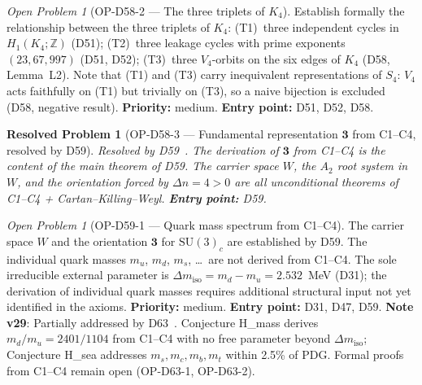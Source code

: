 \documentclass[11pt,a4paper]{article}
\newtheorem{resolvedproblem}{Resolved Problem}
\theoremstyle{plain}
\theoremstyle{definition}
\theoremstyle{remark}
\newtheorem{openproblem}[theorem]{Open Problem}
\begin{document}
\begin{openproblem}[OP-D58-2 --- The three triplets of $K_4$]
\label{op:D58two}
Establish formally the relationship between the three triplets of $K_4$: (T1)~three independent cycles in $H_1(K_4;\mathbb{Z})$ (D51); (T2)~three leakage cycles with prime exponents $(23,67,997)$ (D51, D52); (T3)~three $V_4$-orbits on the six edges of $K_4$ (D58, Lemma~L2). Note that (T1) and (T3) carry inequivalent representations of $S_4$: $V_4$ acts faithfully on (T1) but trivially on (T3), so a naive bijection is excluded (D58, negative result). \textbf{Priority:} medium. \textbf{Entry point:} D51, D52, D58.
\end{openproblem}

\begin{resolvedproblem}[OP-D58-3 --- Fundamental representation $\mathbf{3}$ from C1--C4, resolved by D59]
\label{op:D58three}
\textcolor{proofblue}{Resolved by D59~\cite{D59}.} The derivation of $\mathbf{3}$ from C1--C4 is the content of the main theorem of D59. The carrier space $W$, the $A_2$ root system in $W$, and the orientation forced by $\Delta n = 4 > 0$ are all unconditional theorems of C1--C4 + Cartan--Killing--Weyl. \textbf{Entry point:} D59.
\end{resolvedproblem}

\begin{openproblem}[OP-D59-1 --- Quark mass spectrum from C1--C4]
\label{op:D59one}
The carrier space $W$ and the orientation $\mathbf{3}$ for $\mathrm{SU}(3)_c$ are established by D59. The individual quark masses $m_u$, $m_d$, $m_s$, \ldots\ are not derived from C1--C4. The sole irreducible external parameter is $\Delta m_{\mathrm{iso}} = m_d - m_u = 2.532$~MeV (D31); the derivation of individual quark masses requires additional structural input not yet identified in the axioms. \textbf{Priority:} medium. \textbf{Entry point:} D31, D47, D59. \textbf{Note v29}: Partially addressed by D63~\cite{D63}. Conjecture H\_mass derives $m_d/m_u = 2401/1104$ from C1--C4 with no free parameter beyond $\Delta m_{\mathrm{iso}}$; Conjecture H\_sea addresses $m_s, m_c, m_b, m_t$ within 2.5\% of PDG. Formal proofs from C1--C4 remain open (OP-D63-1, OP-D63-2).
\end{openproblem}
 
\end{document}
